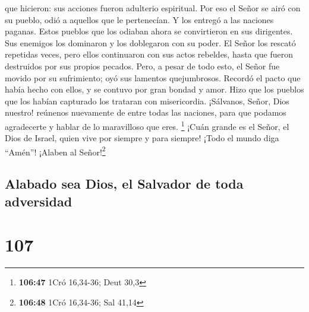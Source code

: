 que hicieron: sus acciones fueron adulterio espiritual. 
Por eso el Señor se airó con su pueblo, odió a aquellos que le
pertenecían.  Y los entregó a las naciones paganas. Estos
pueblos que los odiaban ahora se convirtieron en sus dirigentes.
 Sus enemigos los dominaron y los doblegaron con su
poder.  El Señor los rescató repetidas veces, pero ellos
continuaron con sus actos rebeldes, hasta que fueron destruidos por sus
propios pecados.  Pero, a pesar de todo esto, el Señor
fue movido por su sufrimiento; oyó sus lamentos quejumbrosos.
 Recordó el pacto que había hecho con ellos, y se contuvo
por gran bondad y amor.  Hizo que los pueblos que los
habían capturado los trataran con misericordia. 
¡Sálvanos, Señor, Dios nuestro! reúnenos nuevamente de entre todas las
naciones, para que podamos agradecerte y hablar de lo maravilloso que
eres. \footnote{\textbf{106:47} 1Cró 16,34-36; Deut 30,3}
 ¡Cuán grande es el Señor, el Dios de Israel, quien vive
por siempre y para siempre! ¡Todo el mundo diga ``Amén''! ¡Alaben al
Señor!\footnote{\textbf{106:48} 1Cró 16,34-36; Sal 41,14}

\hypertarget{alabado-sea-dios-el-salvador-de-toda-adversidad}{%
\subsection{Alabado sea Dios, el Salvador de toda
adversidad}\label{alabado-sea-dios-el-salvador-de-toda-adversidad}}

\hypertarget{section-106}{%
\section{107}\label{section-106}}

